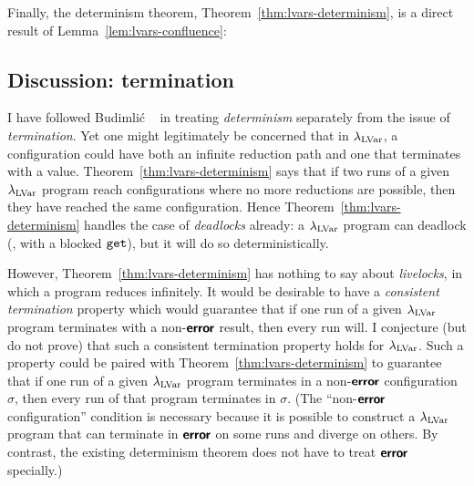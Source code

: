 Finally, the determinism theorem, Theorem~\ref{thm:lvars-determinism},
is a direct result of Lemma~\ref{lem:lvars-confluence}:

\LVarsThmDeterminism

\subsection{Discussion: termination}

I have followed Budimli\'c \etal~\cite{CnC} in treating
\emph{determinism} separately from the issue of \emph{termination}.
Yet one might legitimately be concerned that in $\lambda_{\textrm{LVar}}$, a
configuration could have both an infinite reduction path and one that
terminates with a value.  Theorem~\ref{thm:lvars-determinism} says
that if two runs of a given $\lambda_{\textrm{LVar}}$ program reach configurations
where no more reductions are possible, then they have reached the same
configuration.  Hence Theorem~\ref{thm:lvars-determinism} handles the
case of \emph{deadlocks} already: a $\lambda_{\textrm{LVar}}$ program can deadlock
(\eg, with a blocked $\mbox{\texttt{get}}$), but it will do so deterministically.

However, Theorem~\ref{thm:lvars-determinism} has nothing to say about
\emph{livelocks}, in which a program reduces infinitely.  It would be
desirable to have a \emph{consistent termination} property which would
guarantee that if one run of a given $\lambda_{\textrm{LVar}}$ program terminates
with a non-$\textbf{\textsf{error}}$ result, then every run will.  I conjecture (but do
not prove) that such a consistent termination property holds for
$\lambda_{\textrm{LVar}}$.  Such a property could be paired with
Theorem~\ref{thm:lvars-determinism} to guarantee that if one run of a
given $\lambda_{\textrm{LVar}}$ program terminates in a non-$\textbf{\textsf{error}}$ configuration
$\sigma$, then every run of that program terminates in $\sigma$.  (The
``non-$\textbf{\textsf{error}}$ configuration'' condition is necessary because it is
possible to construct a $\lambda_{\textrm{LVar}}$ program that can terminate in
$\textbf{\textsf{error}}$ on some runs and diverge on others.  By contrast, the
existing determinism theorem does not have to treat $\textbf{\textsf{error}}$
specially.)
